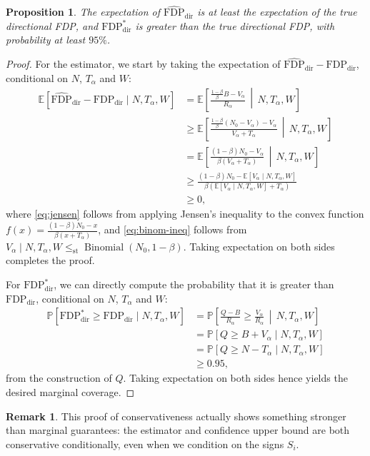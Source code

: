 \documentclass[aoas, preprint]{imsart}
\newtheorem{proposition}[corollary]{Proposition}
\theoremstyle{definition}
\newtheorem*{remark}{Remark}
\theoremstyle{custom}
\newcommand{\EE}{\mathbb{E}}
\newcommand{\PP}{\mathbb{P}}
\DeclareMathOperator{\Binomial}{Binomial}
\newcommand{\FDPd}{\text{FDP}_\text{dir}}
\newcommand{\hFDPd}{\widehat{\text{FDP}}_\text{dir}}
\newcommand{\lest}{\le_\text{st}}
\begin{document}
  \begin{proposition}
    The expectation of $\hFDPd$ is at least the expectation of the true directional FDP, and $\FDPd^*$ is greater than the true directional FDP, with probability at least $95\%$.
    \label{prop:prereg-test}
  \end{proposition}
  \begin{proof}
    For the estimator, we start by taking the expectation of $\hFDPd - \FDPd$, conditional on $N$, $T_\alpha$ and $W$:
    \begin{align}
      \EE[\hFDPd - \FDPd \mid N, T_\alpha, W] &= \EE\left[\frac{\frac{1-\beta}{\beta} B - V_\alpha}{R_\alpha} \,\middle|\, N, T_\alpha, W\right] \nonumber \\
      &\ge \EE\left[\frac{\frac{1-\beta}{\beta} (N_0 - V_\alpha) - V_\alpha}{V_\alpha + T_\alpha} \,\middle|\, N, T_\alpha, W\right] \nonumber \\
      &= \EE\left[\frac{(1-\beta) N_0 - V_\alpha}{\beta (V_\alpha + T_\alpha)} \,\middle|\, N, T_\alpha, W\right] \nonumber \\
      &\ge \frac{(1-\beta) N_0 - \EE[V_\alpha \mid N, T_\alpha, W]}{\beta (\EE[V_\alpha \mid N, T_\alpha, W] + T_\alpha)} \label{eq:jensen} \\
      &\ge 0 \label{eq:binom-ineq},
    \end{align}
    where \eqref{eq:jensen} follows from applying Jensen's inequality to the convex function $f(x) = \frac{(1-\beta) N_0 - x}{\beta(x + T_\alpha)}$, and \eqref{eq:binom-ineq} follows from $V_\alpha \mid N, T_\alpha, W \lest \Binomial(N_0, 1-\beta)$. Taking expectation on both sides completes the proof.

    For $\FDPd^*$, we can directly compute the probability that it is greater than $\FDPd$, conditional on $N$, $T_\alpha$ and $W$:
    \begin{align*}
      \PP[\FDPd^* \ge \FDPd \mid N, T_\alpha, W] &= \PP\left[\frac{Q - B}{R_\alpha} \ge \frac{V_\alpha}{R_\alpha} \,\middle|\, N, T_\alpha, W\right] \\
      &= \PP[Q \ge B + V_\alpha \mid N, T_\alpha, W] \\
      &= \PP[Q \ge N - T_\alpha \mid N, T_\alpha, W] \\
      &\ge 0.95,
    \end{align*}
    from the construction of $Q$. Taking expectation on both sides hence yields the desired marginal coverage.
  \end{proof}

  \begin{remark}
    This proof of conservativeness actually shows something stronger than marginal guarantees: the estimator and confidence upper bound are both conservative conditionally, even when we condition on the signs $S_i$.
  \end{remark}
\end{document}
